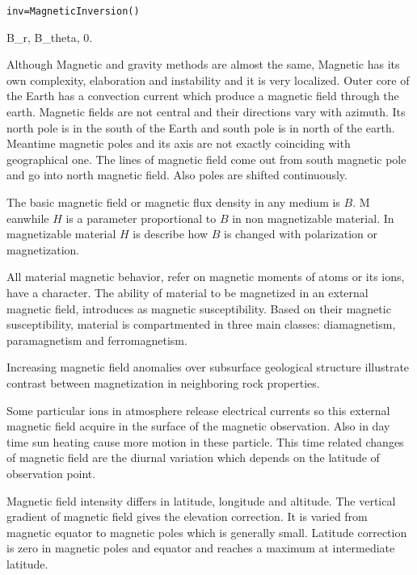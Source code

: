 \begin{verbatim}
inv=MagneticInversion()
\end{verbatim}






 B_r, B_theta, 0.



Although Magnetic and gravity methods are almost the same, 
Magnetic has its own complexity, elaboration and instability and it is very localized.
Outer core of the Earth has a convection current which produce a magnetic field through the earth. 
Magnetic fields are not central and their directions vary with azimuth. Its north pole is in the south of 
the Earth and south pole is in north of the earth. Meantime magnetic poles and its axis are not 
exactly coinciding with geographical one. The lines of magnetic field come out from south magnetic pole and 
go into north magnetic field. Also poles are shifted continuously.

The basic magnetic field or magnetic flux density in any medium is $B$. M
eanwhile $H$ is a parameter proportional to $B$ in non magnetizable material.
 In magnetizable material $H$ is describe how $B$ is changed with polarization or magnetization.

All material magnetic behavior, refer on magnetic moments of atoms or its ions, have a character. 
The ability of material to be magnetized in an external magnetic field, introduces as magnetic susceptibility. 
Based on their magnetic susceptibility, material is compartmented in three main classes: diamagnetism, paramagnetism and ferromagnetism.

Increasing magnetic field anomalies over subsurface geological structure illustrate 
contrast between magnetization in neighboring rock properties.

Some particular ions in atmosphere release electrical currents so this external magnetic field acquire in the surface of the magnetic observation. Also in day time sun heating cause more motion in these particle. This time related changes of magnetic field are the diurnal variation which depends on the latitude of observation point. 

Magnetic field intensity differs in latitude, longitude and altitude. The vertical gradient of magnetic field gives the elevation correction. It is varied from magnetic equator to magnetic poles which is generally small. Latitude correction is zero in magnetic poles and equator and reaches a maximum at intermediate latitude.

